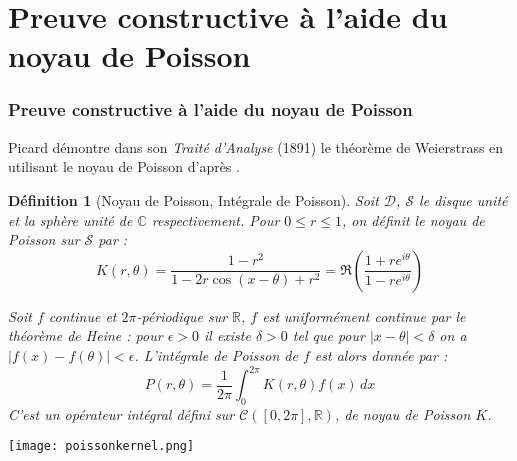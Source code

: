 \documentclass[
	10pt, %
]{beamer}
\newtheorem{defi}[subsubsection]{Définition}
\begin{document}
\section{Preuve constructive à l'aide du noyau de Poisson}
\begin{frame}
\frametitle{Preuve constructive à l'aide du noyau de Poisson}

Picard démontre dans son \textit{Traité d'Analyse} (1891) le théorème de Weierstrass en utilisant le noyau de Poisson d'après \cite{pinkus2000approximation}.
 
\begin{defi}[Noyau de Poisson, Intégrale de Poisson]
	Soit \( \mathcal{D} \), \( \mathcal{S} \) le disque unité et la sphère unité de \( \mathbb{C} \) respectivement. Pour \( 0 \leq r \leq 1 \), on définit le noyau de Poisson sur \( \mathcal{S} \) par :
\begin{equation*}
	K(r,\theta) = \frac{1 - r^{2}}{1-2r\cos(x-\theta)+r^{2}} = \Re(\frac{1 + re^{i\theta}}{1 - re^{i\theta}})
\end{equation*}

Soit \( f \) continue et \( 2\pi\)-périodique sur \( \mathbb{R} \), \( f \) est uniformément continue par le théorème de Heine : pour \( \epsilon > 0 \) il existe \( \delta > 0 \) tel que pour \( {\left\lvert x - \theta \right\rvert} < \delta \) on a \( {\left\lvert f(x) - f(\theta) \right\rvert} < \epsilon \). L'intégrale de Poisson de \( f \) est alors donnée par :
\begin{equation*}
	P(r,\theta) = \frac{1}{2\pi} \int_0^{2\pi} 
	K(r,\theta) f(x) \, dx
\end{equation*}
C'est un opérateur intégral défini sur \( \mathcal{C}([0,2\pi],\mathbb{R}) \), de noyau de Poisson \( K \). \nocite{pinkus2000approximation}

	\end{defi}
\end{frame}

\begin{frame}
	\center\texttt{[image: poissonkernel.png]}
\end{frame}
\end{document}

